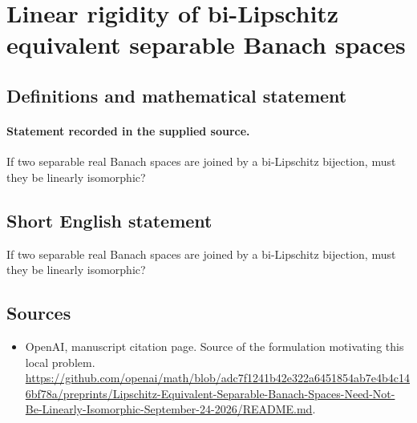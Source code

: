 \documentclass[11pt]{article}
\begin{document}
\section*{Linear rigidity of bi-Lipschitz equivalent separable Banach spaces}\label{30007177}
\subsection{Definitions and mathematical statement}
\paragraph{Statement recorded in the supplied source.}
If two separable real Banach spaces are joined by a bi-Lipschitz bijection, must they be linearly isomorphic?
\subsection{Short English statement}
If two separable real Banach spaces are joined by a bi-Lipschitz bijection, must they be linearly isomorphic?
\subsection{Sources}
\begin{itemize}
\item[S1] OpenAI, manuscript citation page. Source of the formulation motivating this local problem.
\url{https://github.com/openai/math/blob/adc7f1241b42e322a6451854ab7e4b4c146bf78a/preprints/Lipschitz-Equivalent-Separable-Banach-Spaces-Need-Not-Be-Linearly-Isomorphic-September-24-2026/README.md}.
\end{itemize}
\end{document}
